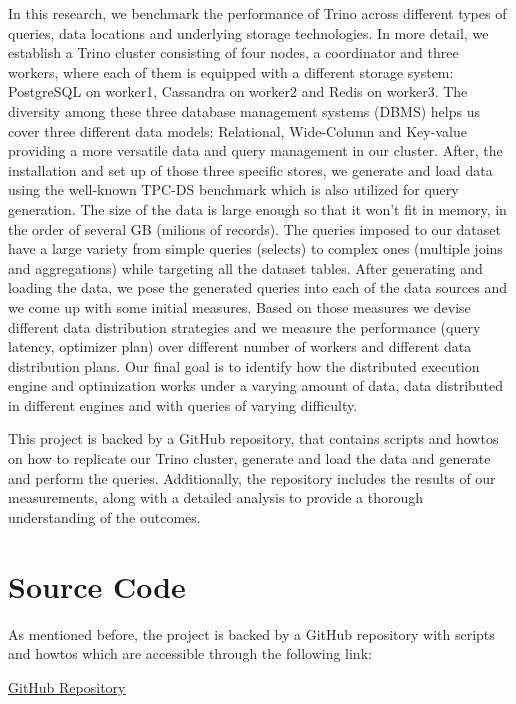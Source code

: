 \documentclass[conference]{IEEEtran}
\begin{document}
In this research, we benchmark the performance of Trino across different types of queries, data locations and underlying
storage technologies. In more detail, we establish a Trino cluster consisting of four nodes, a coordinator and three workers,
where each of them is equipped with a different storage system: PostgreSQL on worker1, Cassandra on worker2 and Redis on worker3.
The diversity among these three database management systems (DBMS) helps us cover three different data models:
Relational, Wide-Column and Key-value providing a more versatile data and query management in our cluster. After, the installation and set up of those three specific stores, we generate and load
data using the well-known TPC-DS \cite{b1} benchmark which is also utilized for query generation.
The size of the data is large enough so that it won't fit in memory, in the order of several GB (milions of records).
The queries imposed to our dataset have a large variety from simple queries (selects) to complex ones (multiple joins and aggregations) while targeting all the dataset tables.
After generating and loading the data, we pose the generated queries into each of the data sources and we come up with some
initial measures. Based on those measures we devise different data distribution strategies and we measure the performance
(query latency, optimizer plan) over different number of workers and different data distribution plans. Our final goal is to
identify how the distributed execution engine and optimization works under a varying amount of data, data distributed in
different engines and with queries of varying difficulty.

This project is backed by a GitHub repository, that contains scripts and howtos on how to replicate our Trino cluster, generate and load the data and
generate and perform the queries. Additionally, the repository includes the results of our measurements, along with a detailed analysis to provide a
thorough understanding of the outcomes.



\section{Source Code}
As mentioned before, the project is backed by a GitHub repository with scripts and howtos which are accessible
through the following link:

\begin{center}
    \textcolor{linkblue}{\underline{\href{https://github.com/alex1on/Information-Systems-NTUA}{GitHub Repository}}}
\end{center}
\end{document}
